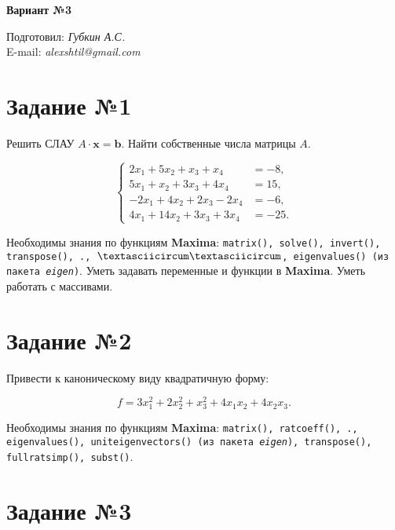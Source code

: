 \begin{center}
    \textbf{\huge Вариант №3}
\end{center}

\begin{flushright}
    Подготовил: \textit{Губкин А.С.}\\
    E-mail: \textit{alexshtil@gmail.com}\\
\end{flushright}

\section*{Задание №1}

    Решить СЛАУ $A \cdot \mathbf{x} = \mathbf{b}$. Найти собственные числа матрицы $A$.

    \[
        \left\{
            \begin{aligned}
                2 x_{1} + 5 x_{2} + x_{3} + x_{4} &= -8,\\
                5 x_{1} + x_{2} + 3 x_{3} + 4 x_{4} &= 15,\\
                -2 x_{1} + 4 x_{2} + 2 x_{3} - 2 x_{4} &= -6,\\
                4 x_{1} + 14 x_{2} + 3 x_{3} + 3 x_{4} &= -25.
            \end{aligned}
        \right.
    \]
    
    Необходимы знания по функциям \textbf{Maxima}: {\tt matrix(), solve(), invert(), transpose(), ., $\textasciicircum \textasciicircum$, eigenvalues() (из пакета \textit{eigen})}. Уметь задавать переменные и функции в \textbf{Maxima}. Уметь работать с массивами.

\section*{Задание №2}

	Привести к каноническому виду квадратичную форму: 

	\[
		f = 3 x^{2}_{1} + 2 x^{2}_{2} + x^{2}_{3} + 4 x_{1} x_{2} + 4 x_{2} x_{3}.
	\]

	Необходимы знания по функциям \textbf{Maxima}: {\tt matrix(), ratcoeff(), ., eigenvalues(), uniteigenvectors() (из пакета \textit{eigen}), transpose(), fullratsimp(), subst()}.

\section*{Задание №3}

